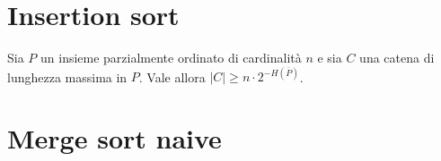 \section{Insertion sort} 
\begin{lemma}
	Sia \(P\) un insieme parzialmente ordinato di cardinalità \(n\) e sia \(C\) una catena di lunghezza massima in \(P\). Vale allora \(\left|C\right|\ge n\cdot2^{-H(\overline{P})}\). 
\end{lemma}

\section{Merge sort naive}

